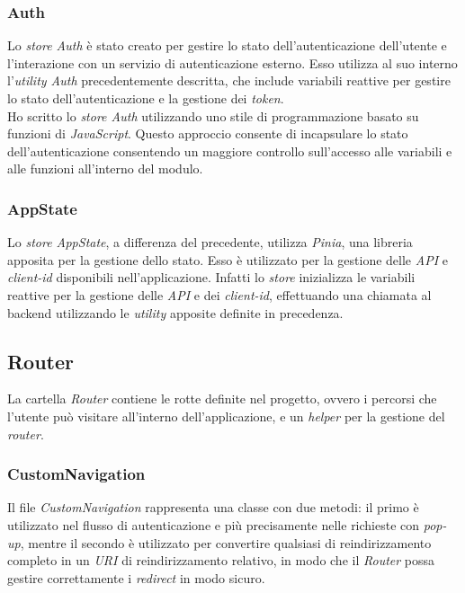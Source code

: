 \subsubsection{Auth}\label{subsubsec:auth-store}
Lo \textit{store Auth} è stato creato per gestire lo stato dell'autenticazione dell'utente e l'interazione con un servizio di autenticazione esterno.
Esso utilizza al suo interno l'\textit{utility Auth} precedentemente descritta, che include variabili reattive per gestire lo stato dell'autenticazione e la gestione dei \textit{token}.\\
Ho scritto lo \textit{store Auth} utilizzando uno stile di programmazione basato su funzioni  di \textit{JavaScript}. Questo approccio consente di incapsulare
lo stato dell'autenticazione consentendo un maggiore controllo sull'accesso alle variabili e alle funzioni all'interno del modulo.

\subsubsection{AppState}\label{subsubsec:app-state}
Lo \textit{store AppState}, a differenza del precedente, utilizza \textit{Pinia}, una libreria apposita per la gestione dello stato.
Esso è utilizzato per la gestione delle \textit{API} e \textit{client-id} disponibili nell'applicazione. Infatti lo \textit{store} inizializza le variabili reattive per la gestione
delle \textit{API} e dei \textit{client-id}, effettuando una chiamata al backend utilizzando le \textit{utility} apposite definite in precedenza.

\subsection{Router}\label{subsec:router}
La cartella \textit{Router} contiene le rotte definite nel progetto, ovvero i percorsi che l'utente può visitare all'interno dell'applicazione, e un \textit{helper} per la gestione del \textit{router}.
\subsubsection{CustomNavigation}\label{subsubsec:custom-navigation}
Il file \textit{CustomNavigation} rappresenta una classe con due metodi: il primo è utilizzato nel flusso di autenticazione e più precisamente nelle richieste con \textit{pop-up},
mentre il secondo è utilizzato per convertire qualsiasi  di reindirizzamento completo in un \textit{URI} di reindirizzamento relativo, in modo che il \textit{Router}
possa gestire correttamente i \textit{redirect} in modo sicuro.

